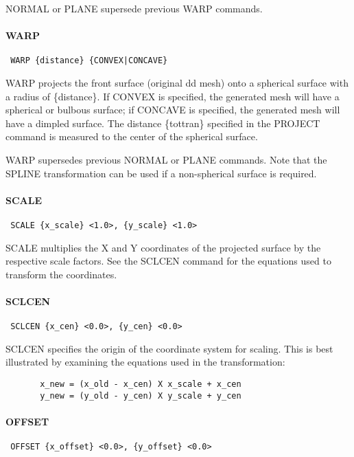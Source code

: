 NORMAL or PLANE supersede previous WARP commands.
\paragraph{WARP}
\begin{verbatim}
 WARP {distance} {CONVEX|CONCAVE}
\end{verbatim}

WARP projects the front surface (original dd mesh) onto a spherical
surface with a radius of \{distance\}.  If CONVEX is specified, the
generated mesh will have a spherical or bulbous surface; if CONCAVE is
specified, the generated mesh will have a dimpled surface.  The distance
\{tottran\} specified in the PROJECT command is measured to the center of
the spherical surface.

WARP supersedes previous NORMAL or PLANE commands.  Note that the SPLINE
transformation can be used if a non-spherical surface is required.
\paragraph{SCALE}
\begin{verbatim}
 SCALE {x_scale} <1.0>, {y_scale} <1.0>
\end{verbatim}

SCALE multiplies the X and Y coordinates of the projected
surface by the respective scale factors.  See the SCLCEN command for the
equations used to transform the coordinates.
\paragraph{SCLCEN}
\begin{verbatim}
 SCLCEN {x_cen} <0.0>, {y_cen} <0.0>
\end{verbatim}

SCLCEN specifies the origin of the coordinate system for scaling.  This
is best illustrated by examining the equations used in the
transformation:  

\begin{verbatim}
       x_new = (x_old - x_cen) X x_scale + x_cen
       y_new = (y_old - y_cen) X y_scale + y_cen
\end{verbatim}

\paragraph{OFFSET}
\begin{verbatim}
 OFFSET {x_offset} <0.0>, {y_offset} <0.0>
\end{verbatim}

